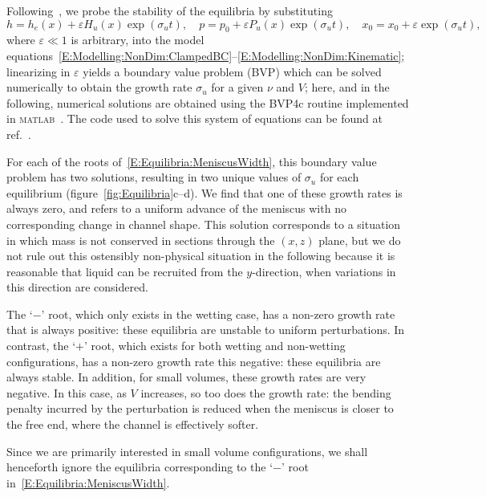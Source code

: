 \documentclass{jfm}
\renewcommand{\Pi}{P}
\renewcommand{\Lambda}{H} %
\begin{document}
Following~\citet{Taroni2012JFM}, we probe the stability of the equilibria by substituting
\begin{equation}\label{E:Equilibria:uniform_perturbation}
h = h_e(x) + \varepsilon \Lambda_u(x)\exp(\sigma_u t),\quad p = p_0 + \varepsilon \Pi_u(x)\exp(\sigma_u t),\quad x_0 = x_0 +  \varepsilon \exp(\sigma_u t),
\end{equation}
where $\varepsilon \ll 1$ is arbitrary, into the model equations~\eqref{E:Modelling:NonDim:ClampedBC}--\eqref{E:Modelling:NonDim:Kinematic}; linearizing in $\varepsilon$ yields a boundary value problem (BVP) which can be solved numerically to obtain the growth rate $\sigma_u$ for a given $\nu$ and $V$; here, and in the following, numerical solutions are obtained using the BVP4c routine implemented in \textsc{matlab}~\citep{Kierzenka2001BVP}. The code used to solve this system of equations can be found at ref.~\citet{BendocapillaryRepo}.

For each of the roots of~\eqref{E:Equilibria:MeniscusWidth}, this boundary value problem has two solutions, resulting in two unique values of $\sigma_u$ for each equilibrium (figure~\ref{fig:Equilibria}c--d). We find that one of these growth rates is always zero, and refers to a uniform advance of the meniscus with no corresponding change in channel shape. This solution corresponds to a situation in which mass is not conserved in sections through the $(x,z)$ plane, but we do not rule out this ostensibly non-physical situation in the following because it is reasonable that liquid can be recruited from the $y$-direction, when variations in this direction are considered.

The `$-$' root, which only exists in the wetting case, has a non-zero growth rate that is always positive: these equilibria are unstable to uniform perturbations. In contrast, the `$+$' root, which exists for both wetting and non-wetting configurations, has a non-zero growth rate this negative: these equilibria are always stable. In addition, for small volumes, these growth rates are very negative. In this case, as $V$ increases, so too does the growth rate: the bending penalty incurred by the perturbation is reduced when the meniscus is closer to the free end, where the channel is effectively softer.

Since we are primarily interested in small volume configurations, we shall henceforth ignore the equilibria corresponding to the `$-$' root in~\eqref{E:Equilibria:MeniscusWidth}.
\end{document}
